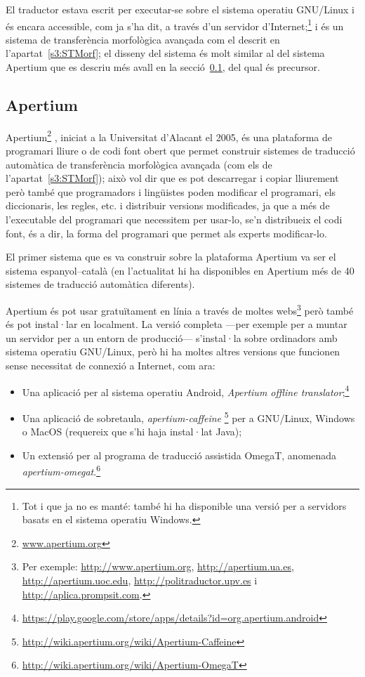 El traductor estava escrit per executar-se sobre el sistema operatiu
GNU/Linux i és encara accessible, com ja s'ha dit, a través d'un
servidor d'Internet;\footnote{Tot i que ja no es manté: també hi ha
  disponible una versió per a servidors basats en el sistema operatiu
  Windows.} i és un sistema de transferència morfològica avançada com
el descrit en l'apartat~\ref{s3:STMorf}; el disseny del sistema és
molt similar al del sistema Apertium que es descriu més avall en la
secció~\ref{ss:apertium}, del qual és precursor.

\subsection{Apertium}
\label{ss:apertium}

Apertium\footnote{\url{www.apertium.org}} \citep{forcada2011apertium},
iniciat a la Universitat d'Alacant el 2005, és una plataforma de
programari lliure o de codi font obert que permet construir sistemes
de traducció automàtica de transferència morfològica avançada (com els
de l'apartat~\ref{s3:STMorf}); això vol dir que es pot descarregar i
copiar lliurement però també que programadors i lingüistes poden
modificar el programari, els diccionaris, les regles, etc. i
distribuir versions modificades, ja que a més de l'executable del
programari que necessitem per usar-lo, se'n distribueix el codi font,
és a dir, la forma del programari que permet als experts modificar-lo.

El primer sistema que es va construir sobre la plataforma Apertium va
ser el sistema espanyol--català (en l'actualitat hi ha disponibles en
Apertium més de 40 sistemes de traducció automàtica diferents).

Apertium és pot usar gratuïtament en línia a través de moltes
webs\footnote{Per exemple: \url{http://www.apertium.org},
  \url{http://apertium.ua.es}, \url{http://apertium.uoc.edu},
  \url{http://politraductor.upv.es} i
  \url{http://aplica.prompsit.com}.} però també és pot instal·lar en
localment. La versió completa ---per exemple per a muntar un servidor
per a un entorn de producció--- s'instal·la sobre ordinadors amb sistema
operatiu GNU/Linux, però hi ha moltes altres versions que funcionen sense necessitat de connexió a Internet, com ara:
\begin{itemize}
\item Una aplicació per al sistema operatiu Android, \emph{Apertium
    offline
    translator};\footnote{\url{https://play.google.com/store/apps/details?id=org.apertium.android}}
\item Una aplicació de sobretaula, \emph{apertium-caffeine}
  \footnote{\url{http://wiki.apertium.org/wiki/Apertium-Caffeine}} per
  a GNU/Linux, Windows o MacOS (requereix que s'hi haja instal·lat
  Java);
\item Un extensió per al programa de traducció assistida OmegaT, anomenada \emph{apertium-omegat}.\footnote{\url{http://wiki.apertium.org/wiki/Apertium-OmegaT}}
\end{itemize}




